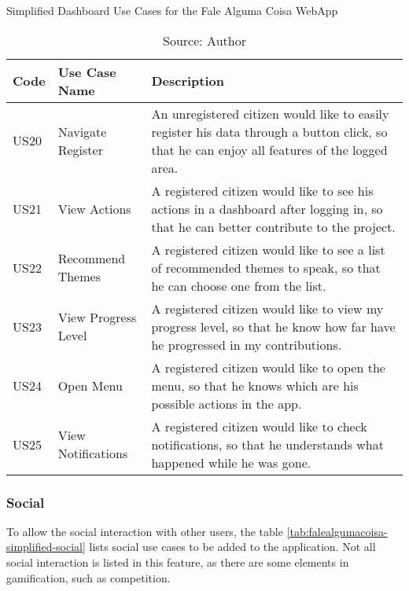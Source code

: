 \begin{table}[h]
\caption{Simplified Dashboard Use Cases for the Fale Alguma Coisa WebApp}
\label{tab:falealgumacoisa-simplified-dashboard}
\centering
\begin{tabular}{|p{1cm}|p{3cm}|p{10cm}|}
\hline
    Code & Use Case Name & Description \\ \hline
    US20 & Navigate Register & An unregistered citizen would like to easily register his data through a button click, so that he can enjoy all features of the logged area. \\ \hline
    US21 & View Actions & A registered citizen would like to see his actions in a dashboard after logging in, so that he can better contribute to the project. \\ \hline
    US22 & Recommend Themes & A registered citizen would like to see a list of recommended themes to speak, so that he can choose one from the list. \\ \hline
    US23 & View Progress Level & A registered citizen would like to view my progress level, so that he know how far have he  progressed in my contributions. \\ \hline
    US24 & Open Menu & A registered citizen would like to open the menu, so that he knows which are his possible actions in the app. \\ \hline
    US25 & View Notifications & A registered citizen would like to check notifications, so that he understands what happened while he was gone. \\ \hline
\end{tabular}
\caption*{Source: Author}
\end{table}

\subsubsection{Social}

To allow the social interaction with other users, the table \ref{tab:falealgumacoisa-simplified-social} lists social use cases to be added to the application. Not all social interaction is listed in this feature, as there are some elements in gamification, such as competition.


